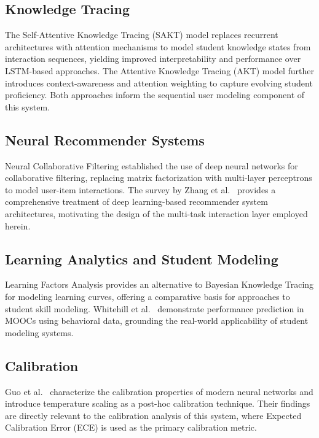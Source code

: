 \documentclass[12pt]{article}
\begin{document}
\subsection{Knowledge Tracing}

The Self-Attentive Knowledge Tracing (SAKT) model \cite{pandey2019sakt} replaces recurrent architectures with attention mechanisms to model student knowledge states from interaction sequences, yielding improved interpretability and performance over LSTM-based approaches. The Attentive Knowledge Tracing (AKT) model \cite{ghosh2020akt} further introduces context-awareness and attention weighting to capture evolving student proficiency. Both approaches inform the sequential user modeling component of this system.

\subsection{Neural Recommender Systems}

Neural Collaborative Filtering \cite{he2017ncf} established the use of deep neural networks for collaborative filtering, replacing matrix factorization with multi-layer perceptrons to model user-item interactions. The survey by Zhang et al.\ \cite{zhang2019dlrecsys} provides a comprehensive treatment of deep learning-based recommender system architectures, motivating the design of the multi-task interaction layer employed herein.

\subsection{Learning Analytics and Student Modeling}

Learning Factors Analysis \cite{cen2006lfa} provides an alternative to Bayesian Knowledge Tracing for modeling learning curves, offering a comparative basis for approaches to student skill modeling. Whitehill et al.\ \cite{whitehill2017mooc} demonstrate performance prediction in MOOCs using behavioral data, grounding the real-world applicability of student modeling systems.

\subsection{Calibration}

Guo et al.\ \cite{guo2017calibration} characterize the calibration properties of modern neural networks and introduce temperature scaling as a post-hoc calibration technique. Their findings are directly relevant to the calibration analysis of this system, where Expected Calibration Error (ECE) is used as the primary calibration metric.
\end{document}
